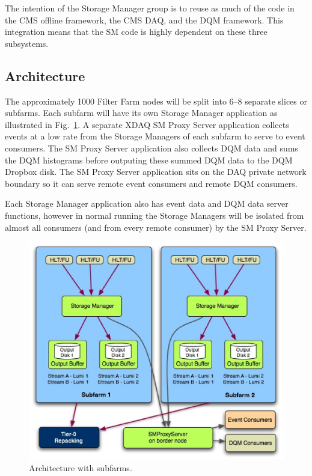 The intention of the Storage Manager group is to reuse as much of the code in
the CMS offline framework, the CMS DAQ, and the DQM framework. This
integration means that the SM code is highly dependent on these three 
subsystems.

\subsection{Architecture}

The approximately 1000 Filter Farm nodes will be split into 6--8 separate
slices or subfarms. Each subfarm will have its own Storage Manager application
as illustrated in Fig.~\ref{fig:SM_architecture_base}. A separate XDAQ 
SM Proxy Server application collects events at a low rate from the
Storage Managers of each subfarm to serve to event consumers. The SM Proxy
Server application also collects DQM data and sums the DQM histograms before
outputing these summed DQM data to the DQM Dropbox disk. The SM Proxy Server
application sits on the DAQ private network boundary so it can serve remote
event consumers and remote DQM consumers.

Each Storage Manager application also has event data and DQM data server
functions, however in normal running the Storage Managers will be isolated from
almost all consumers (and from every remote consumer) by the SM Proxy Server.

\begin{figure}[hbtp]
  \begin{center}
    \includegraphics[width=4.5in]{Software/SM_architecture_base.eps}
    \caption{Architecture with subfarms.}
    \label{fig:SM_architecture_base}
  \end{center}
\end{figure}

